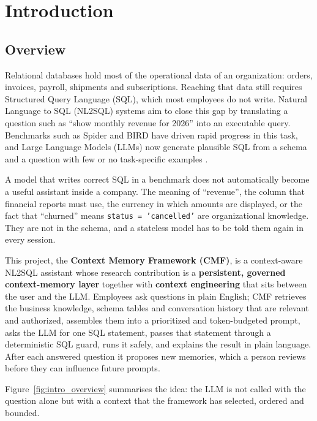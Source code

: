 \chapter{Introduction}

\section{Overview}
Relational databases hold most of the operational data of an organization: orders,
invoices, payroll, shipments and subscriptions. Reaching that data still requires
Structured Query Language (SQL), which most employees do not write. Natural Language to SQL
(NL2SQL) systems aim to close this gap by translating a question such as ``show monthly
revenue for 2026'' into an executable query. Benchmarks such as Spider \cite{yu2018spider}
and BIRD \cite{li2023bird} have driven rapid progress in this task, and Large Language
Models (LLMs) now generate plausible SQL from a schema and a question with few or no
task-specific examples \cite{rajkumar2022evaluating, pourreza2023dinsql, gao2023dailsql}.

A model that writes correct SQL in a benchmark does not automatically become a useful
assistant inside a company. The meaning of ``revenue'', the column that financial reports
must use, the currency in which amounts are displayed, or the fact that ``churned'' means
\texttt{status = 'cancelled'} are organizational knowledge. They are not in the schema, and
a stateless model has to be told them again in every session.

This project, the \textbf{Context Memory Framework (CMF)}, is a context-aware NL2SQL
assistant whose research contribution is a \textbf{persistent, governed context-memory
layer} together with \textbf{context engineering} that sits between the user and the LLM.
Employees ask questions in plain English; CMF retrieves the business knowledge, schema
tables and conversation history that are relevant and authorized, assembles them into a
prioritized and token-budgeted prompt, asks the LLM for one SQL statement, passes that
statement through a deterministic SQL guard, runs it safely, and explains the result in
plain language. After each answered question it proposes new memories, which a person
reviews before they can influence future prompts.

Figure~\ref{fig:intro_overview} summarises the idea: the LLM is not called with the
question alone but with a context that the framework has selected, ordered and bounded.

